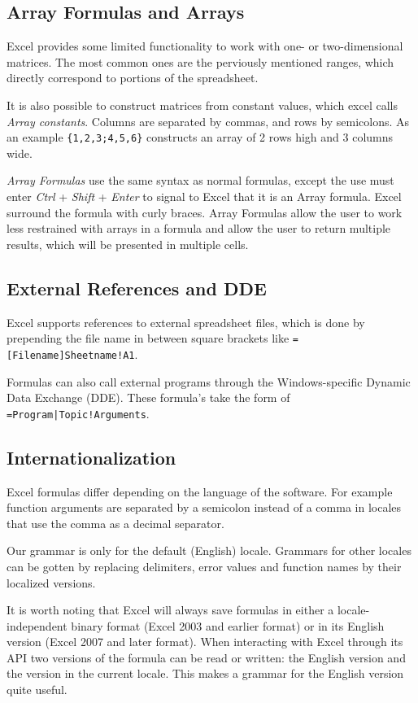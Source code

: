 \documentclass[conference]{IEEEtran}
\begin{document}
\subsection{Array Formulas and Arrays}

Excel provides some limited functionality to work with one- or two-dimensional matrices. The most common ones are the perviously mentioned ranges, which directly correspond to portions of the spreadsheet.

It is also possible to construct matrices from constant values, which excel calls \emph{Array constants}. Columns are separated by commas, and rows by semicolons. As an example \texttt{\{1,2,3;4,5,6\}} constructs an array of 2 rows high and 3 columns wide.

\emph{Array Formulas} use the same syntax as normal formulas, except the use must enter \emph{Ctrl} + \emph{Shift} + \emph{Enter} to signal to Excel that it is an Array formula. Excel surround the formula with curly braces. Array Formulas allow the user to work less restrained with arrays in a formula and allow the user to return multiple results, which will be presented in multiple cells.

\subsection{External References and DDE}

Excel supports references to external spreadsheet files, which is done by prepending the file name in between square brackets like \texttt{=[Filename]Sheetname!A1}.

Formulas can also call external programs through the Windows-specific Dynamic Data Exchange (DDE).
These formula's take the form of \texttt{=Program|Topic!Arguments}.

\subsection{Internationalization}

Excel formulas differ depending on the language of the software. For example function arguments are separated by a semicolon instead of a comma in locales that use the comma as a decimal separator.

Our grammar is only for the default (English) locale. Grammars for other locales can be gotten by replacing delimiters, error values and function names by their localized versions.

It is worth noting that Excel will always save formulas in either a locale-independent binary format (Excel 2003 and earlier format) or in its English version (Excel 2007 and later format). When interacting with Excel through its API two versions of the formula can be read or written: the English version and the version in the current locale.
This makes a grammar for the English version quite useful.
\end{document}
